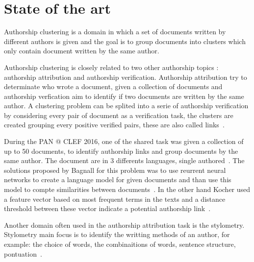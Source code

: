 \section{State of the art \label{sec:state_of_the_art}}


Authorship clustering is a domain in which a set of documents written by different authors is given and the goal is to group documents into clusters which only contain document written by the same author.

Authorship clustering is closely related to two other authorship topics : authorship attribution and authorship verification.
Authorship attribution try to determinate who wrote a document, given a collection of documents and authorship verfication aim to identify if two documents are written by the same author.
A clustering problem can be splited into a serie of authorship verification by considering every pair of document as a verification task, the clusters are created grouping every positive verified pairs, these are also called links~\cite{pan16_clustering_site}.

During the PAN @ CLEF 2016, one of the shared task was given a collection of up to 50 documents, to identify authorship links and group documents by the same author.
The document are in 3 differents languages, single authored~\cite{pan16}.
The solutions proposed by Bagnall for this problem was to use reurrent neural networks to create a language model for given documents and than use this model to compte similarities between documents~\cite{bagnall_pan16}.
In the other hand Kocher used a feature vector based on most frequent terms in the texts and a distance threshold between these vector indicate a potential authorship link~\cite{kocher_pan16}.

Another domain often used in the authorship attribution task is the stylometry.
Stylometry main focus is to identify the writting methods of an author, for example: the choice of words, the combinaitions of words, sentence structure, pontuation~\cite{savoy_stylo}.
